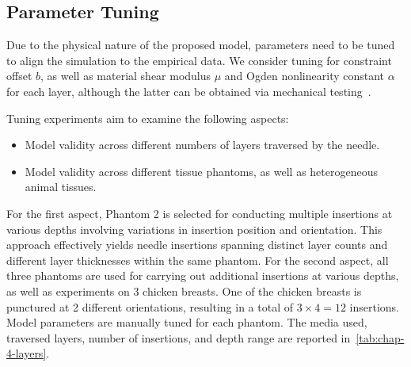 \subsection{Parameter Tuning}
\label{sec:chap-4-parameter-tuning}
Due to the physical nature of the proposed model, parameters need to be tuned to align the simulation to the empirical data. We consider tuning for constraint offset $b$, as well as material shear modulus $\mu$ and Ogden nonlinearity constant $\alpha$ for each layer, although the latter can be obtained via mechanical testing~\parencite{singhMechanicalPropertiesWholebody2021}.

Tuning experiments aim to examine the following aspects: 
\begin{itemize}
\item Model validity across different numbers of layers traversed by the needle.
\item Model validity across different tissue phantoms, as well as heterogeneous animal tissues.
\end{itemize}

For the first aspect, Phantom 2 is selected for conducting multiple insertions at various depths involving variations in insertion position and orientation. This approach effectively yields needle insertions spanning distinct layer counts and different layer thicknesses within the same phantom. For the second aspect, all three phantoms are used for carrying out additional insertions at various depths, as well as experiments on 3 chicken breasts. One of the chicken breasts is punctured at 2 different orientations, resulting in a total of $3\times4 = 12$ insertions. Model parameters are manually tuned for each phantom. The media used, traversed layers, number of insertions, and depth range are reported in~\cref{tab:chap-4-layers}.

